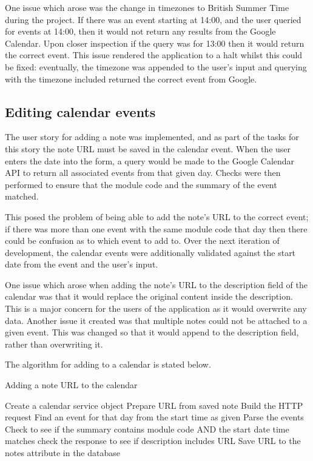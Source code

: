 {{{{{{{One issue which arose was the change in timezones to British Summer Time during the project. If there was an event starting at 14:00, and the user queried for events at 14:00, then it would not return any results from the Google Calendar. Upon closer inspection if the query was for 13:00 then it would return the correct event. This issue rendered the application to a halt whilst this could be fixed: eventually, the timezone was appended to the user's input and querying with the timezone included returned the correct event from Google.

\subsection{Editing calendar events}
The user story for adding a note was implemented, and as part of the tasks for this story the note URL must be saved in the calendar event. When the user enters the date into the form, a query would be made to the Google Calendar API to return all associated events from that given day. Checks were then performed to ensure that the module code and the summary of the event matched.

This posed the problem of being able to add the note's URL to the correct event; if there was more than one event with the same module code that day then there could be confusion as to which event to add to.
Over the next iteration of development, the calendar events were additionally validated against the start date from the event and the user's input.

One issue which arose when adding the note's URL to the description field of the calendar was that it would replace the original content inside the description. This is a major concern for the users of the application as it would overwrite any data. Another issue it created was that multiple notes could not be attached to a given event. This was changed so that it would append to the description field, rather than overwriting it.

The algorithm for adding to a calendar is stated below.
\begin{algorithm}
  \caption{Adding a note URL to the calendar}
  \label{algorithm:threshold2}
  \begin{algorithmic}[1]
      \State Create a calendar service object
      \State Prepare URL from saved note
      \State Build the HTTP request
      \State Find an event for that day from the start time as given
      \State Parse the events
      \State Check to see if the summary contains module code AND the start date time matches
        \State check the response to see if description includes URL
        \State Save URL to the notes attribute in the database
      \EndIf
  \end{algorithmic}
\end{algorithm}

}}}}}}}
